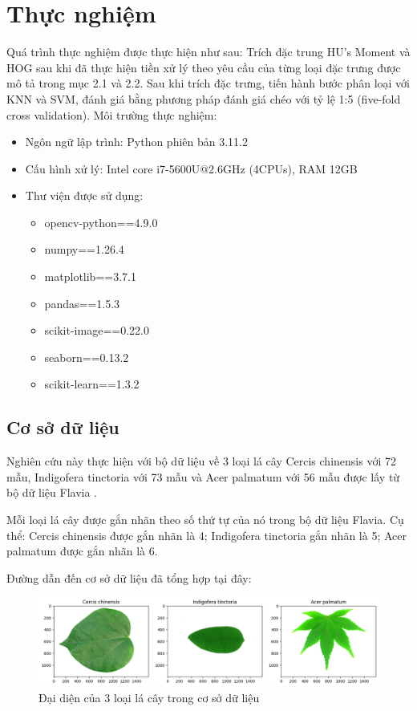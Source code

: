 \documentclass[a4paper]{article}
\begin{document}
\section{Thực nghiệm}
Quá trình thực nghiệm được thực hiện như sau: Trích đặc trung HU's Moment và HOG sau khi đã thực hiện tiền xử lý theo yêu cầu của từng loại đặc trưng được mô tả trong mục 2.1 và 2.2. Sau khi trích đặc trưng, tiến hành bước phân loại với KNN và SVM, đánh giá bằng phương pháp đánh giá chéo với tỷ lệ 1:5 (five-fold cross validation). Môi trường thực nghiệm:
\begin{itemize}[label={}]
    \item Ngôn ngữ lập trình: Python phiên bản 3.11.2
    \item Cấu hình xử lý: Intel core i7-5600U@2.6GHz (4CPUs), RAM 12GB
    \item Thư viện được sử dụng:
    \begin{itemize}[label={}]
        \item opencv-python==4.9.0
        \item numpy==1.26.4
        \item matplotlib==3.7.1
        \item pandas==1.5.3
        \item scikit-image==0.22.0
        \item seaborn==0.13.2
        \item scikit-learn==1.3.2
    \end{itemize}
\end{itemize}
\subsection{Cơ sở dữ liệu}
Nghiên cứu này thực hiện với bộ dữ liệu về 3 loại lá cây Cercis chinensis với 72 mẫu, Indigofera tinctoria với 73 mẫu và Acer palmatum với 56 mẫu được lấy từ bộ dữ liệu Flavia \cite{wu2007leaf}. 

Mỗi loại lá cây được gắn nhãn theo số thứ tự của nó trong bộ dữ liệu Flavia. Cụ thể: Cercis chinensis được gắn nhãn là 4; Indigofera tinctoria gắn nhãn là 5; Acer palmatum được gắn nhãn là 6.

Đường dẫn đến cơ sở dữ liệu đã tổng hợp tại đây: \url{}

\begin{figure}
    \centering
    \includegraphics[width=1\linewidth]{images/data.png}
    \caption{Đại diện của 3 loại lá cây trong cơ sở dữ liệu}
    \label{fig:data}
\end{figure}
\end{document}
